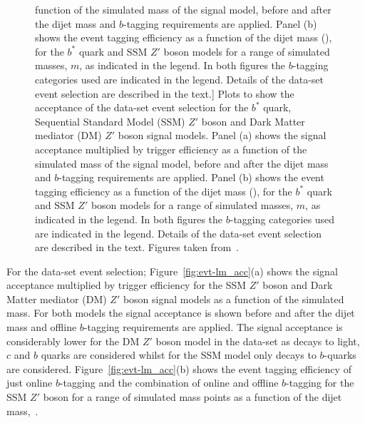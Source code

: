 \begin{figure}[!ht]
            function of the simulated mass of the signal model, before and after the
            dijet mass and $b$-tagging requirements are applied.
            Panel (b) shows the event tagging efficiency as a function of the dijet mass (\mjj{}),
            for the $b^*$ quark and SSM $Z'$ boson models
            for a range of simulated masses, $m$, as indicated in the legend.
            In both figures the $b$-tagging categories used are indicated in the legend.
            Details of the \hm{} data-set event selection are described in the text.]
          {Plots to show the acceptance of the \hm{} data-set event selection for the $b^*$ quark,
            Sequential Standard Model (SSM) $Z'$ boson and Dark Matter mediator (DM) $Z'$ boson signal models.
            Panel (a) shows the signal acceptance multiplied by trigger efficiency as a
            function of the simulated mass of the signal model, before and after the
            dijet mass and $b$-tagging requirements are applied.
            Panel (b) shows the event tagging efficiency as a function of the dijet mass (\mjj{}),
            for the $b^*$ quark and SSM $Z'$ boson models
            for a range of simulated masses, $m$, as indicated in the legend.
            In both figures the $b$-tagging categories used are indicated in the legend.
            Details of the \hm{} data-set event selection are described in the text.
            Figures taken from~\cite{dibjet-full_int}.} 
  \label{fig:evt-hm_acc}
\end{figure}

For the \lm{} data-set event selection;
Figure~\ref{fig:evt-lm_acc}(a) shows the signal acceptance multiplied by trigger efficiency
for the SSM $Z'$ boson and Dark Matter mediator (DM) $Z'$ boson signal models as a function of the simulated mass.
For both models the signal acceptance is shown before and after the
dijet mass and offline $b$-tagging requirements are applied.
The signal acceptance is considerably lower for the DM $Z'$ boson model in the \lm{} data-set
as decays to light, $c$ and $b$ quarks are considered
whilst for the SSM model only decays to $b$-quarks are considered.
Figure~\ref{fig:evt-lm_acc}(b) shows the event tagging efficiency
of just online $b$-tagging and the combination of online and offline $b$-tagging
for the SSM $Z'$ boson for a range of simulated mass points
as a function of the dijet mass,~\mjj.

